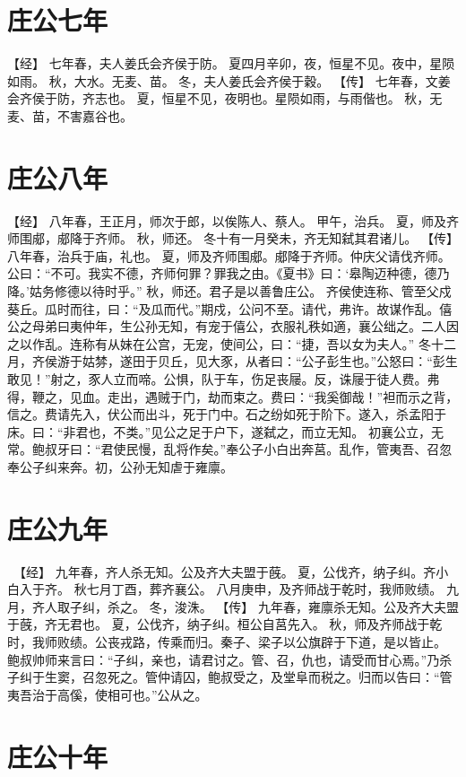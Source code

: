 \documentclass[a4paper,12pt,UTF8,twoside]{ctexbook}
\begin{document}
\chapter{庄公七年}

【经】
七年春，夫人姜氏会齐侯于防。
夏四月辛卯，夜，恒星不见。夜中，星陨如雨。
秋，大水。无麦、苗。
冬，夫人姜氏会齐侯于穀。
【传】
七年春，文姜会齐侯于防，齐志也。
夏，恒星不见，夜明也。星陨如雨，与雨偕也。
秋，无麦、苗，不害嘉谷也。

\chapter{庄公八年}

【经】
八年春，王正月，师次于郎，以俟陈人、蔡人。
甲午，治兵。
夏，师及齐师围郕，郕降于齐师。
秋，师还。
冬十有一月癸未，齐无知弑其君诸儿。
【传】
八年春，治兵于庙，礼也。
夏，师及齐师围郕。郕降于齐师。仲庆父请伐齐师。公曰：“不可。我实不德，齐师何罪？罪我之由。《夏书》曰：‘皋陶迈种德，德乃降。’姑务修德以待时乎。”
秋，师还。君子是以善鲁庄公。
齐侯使连称、管至父戍葵丘。瓜时而往，曰：“及瓜而代。”期戍，公问不至。请代，弗许。故谋作乱。僖公之母弟曰夷仲年，生公孙无知，有宠于僖公，衣服礼秩如適，襄公绌之。二人因之以作乱。连称有从妹在公宫，无宠，使间公，曰：“捷，吾以女为夫人。”
冬十二月，齐侯游于姑棼，遂田于贝丘，见大豕，从者曰：“公子彭生也。”公怒曰：“彭生敢见！”射之，豕人立而啼。公惧，队于车，伤足丧屦。反，诛屦于徒人费。弗得，鞭之，见血。走出，遇贼于门，劫而束之。费曰：“我奚御哉！”袒而示之背，信之。费请先入，伏公而出斗，死于门中。石之纷如死于阶下。遂入，杀孟阳于床。曰：“非君也，不类。”见公之足于户下，遂弑之，而立无知。
初襄公立，无常。鲍叔牙曰：“君使民慢，乱将作矣。”奉公子小白出奔莒。乱作，管夷吾、召忽奉公子纠来奔。初，公孙无知虐于雍廪。

\chapter{庄公九年}

　【经】
九年春，齐人杀无知。公及齐大夫盟于蔇。
夏，公伐齐，纳子纠。齐小白入于齐。
秋七月丁酉，葬齐襄公。
八月庚申，及齐师战于乾时，我师败绩。
九月，齐人取子纠，杀之。
冬，浚洙。
【传】
九年春，雍廪杀无知。公及齐大夫盟于蔇，齐无君也。
夏，公伐齐，纳子纠。桓公自莒先入。
秋，师及齐师战于乾时，我师败绩。公丧戎路，传乘而归。秦子、梁子以公旗辟于下道，是以皆止。
鲍叔帅师来言曰：“子纠，亲也，请君讨之。管、召，仇也，请受而甘心焉。”乃杀子纠于生窦，召忽死之。管仲请囚，鲍叔受之，及堂阜而税之。归而以告曰：“管夷吾治于高傒，使相可也。”公从之。

\chapter{庄公十年}
\end{document}
